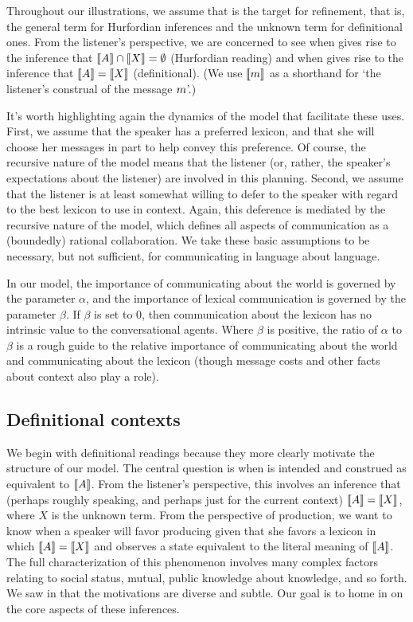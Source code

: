 \documentclass[12pt,twoside]{article}
\renewcommand{\_}{\textbf{\textunderscore\hspace{-4pt}\textunderscore\hspace{-3pt}\textunderscore\hspace{-4pt}\textunderscore}\hspace{0.5pt}}			%
\begin{document}
Throughout our illustrations, we assume that  is the target
for refinement, that is, the general term for Hurfordian inferences
and the unknown term for definitional ones.  From the listener's
perspective, we are concerned to see when  gives rise to
the inference that $\llbracket A\rrbracket \cap \llbracket X\rrbracket = \emptyset$ (Hurfordian
reading) and when  gives rise to the inference that
$\llbracket A\rrbracket = \llbracket X\rrbracket$ (definitional). (We use $\llbracket m\rrbracket$ as a
shorthand for `the listener's construal of the message $m$'.)

It's worth highlighting again the dynamics of the model that
facilitate these uses. First, we assume that the speaker has a
preferred lexicon, and that she will choose her messages in part to
help convey this preference. Of course, the recursive nature of the
model means that the listener (or, rather, the speaker's expectations
about the listener) are involved in this planning. Second, we assume
that the listener is at least somewhat willing to defer to the speaker
with regard to the best lexicon to use in context. Again, this
deference is mediated by the recursive nature of the model, which
defines all aspects of communication as a (boundedly) rational
collaboration. We take these basic assumptions to be necessary, but
not sufficient, for communicating in language about language.

In our model, the importance of communicating about the world is
governed by the parameter $\alpha$, and the importance of lexical
communication is governed by the parameter $\beta$. If $\beta$ is set
to $0$, then communication about the lexicon has no intrinsic value to
the conversational agents.  Where $\beta$ is positive, the ratio of
$\alpha$ to $\beta$ is a rough guide to the relative importance of
communicating about the world and communicating about the lexicon
(though message costs and other facts about context also play a role).


\subsection{Definitional contexts}\label{sec:analysis:definitional}

We begin with definitional readings because they more clearly motivate
the structure of our model. The central question is when 
is intended and construed as equivalent to $\llbracket A\rrbracket$. From the
listener's perspective, this involves an inference that (perhaps
roughly speaking, and perhaps just for the current context)
$\llbracket A\rrbracket=\llbracket X\rrbracket$, where $X$ is the unknown term. From the perspective
of production, we want to know when a speaker will favor producing
 given that she favors a lexicon in which
$\llbracket A\rrbracket=\llbracket X\rrbracket$ and observes a state equivalent to the literal
meaning of $\llbracket A\rrbracket$. The full characterization of this phenomenon
involves many complex factors relating to social status, mutual,
public knowledge about knowledge, and so forth. We saw in
 that the motivations are diverse and subtle. Our
goal is to home in on the core aspects of these inferences.
\end{document}

